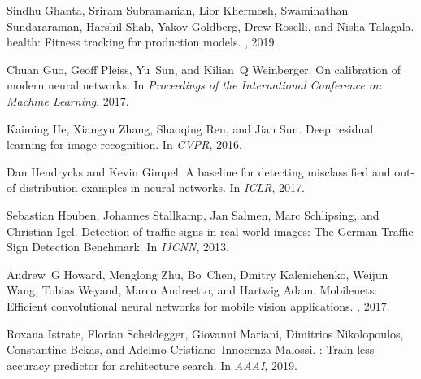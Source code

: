 \documentclass{article}
\begin{document}
\begin{thebibliography}{}
Sindhu Ghanta, Sriram Subramanian, Lior Khermosh, Swaminathan Sundararaman,
  Harshil Shah, Yakov Goldberg, Drew Roselli, and Nisha Talagala.
 health: Fitness tracking for production models.
, 2019.

Chuan Guo, Geoff Pleiss, Yu~Sun, and Kilian~Q Weinberger.
\newblock On calibration of modern neural networks.
\newblock In {\em Proceedings of the International Conference on Machine
  Learning}, 2017.

Kaiming He, Xiangyu Zhang, Shaoqing Ren, and Jian Sun.
\newblock Deep residual learning for image recognition.
\newblock In {\em CVPR}, 2016.

Dan Hendrycks and Kevin Gimpel.
\newblock A baseline for detecting misclassified and out-of-distribution
  examples in neural networks.
\newblock In {\em ICLR}, 2017.

Sebastian Houben, Johannes Stallkamp, Jan Salmen, Marc Schlipsing, and
  Christian Igel.
\newblock Detection of traffic signs in real-world images: The {G}erman
  {T}raffic {S}ign {D}etection {B}enchmark.
\newblock In {\em IJCNN}, 2013.

Andrew~G Howard, Menglong Zhu, Bo~Chen, Dmitry Kalenichenko, Weijun Wang,
  Tobias Weyand, Marco Andreetto, and Hartwig Adam.
\newblock Mobilenets: Efficient convolutional neural networks for mobile vision
  applications.
, 2017.

Roxana Istrate, Florian Scheidegger, Giovanni Mariani, Dimitrios Nikolopoulos,
  Constantine Bekas, and Adelmo Cristiano~Innocenza Malossi.
: Train-less accuracy predictor for architecture search.
\newblock In {\em AAAI}, 2019.


\end{thebibliography}
\end{document}
